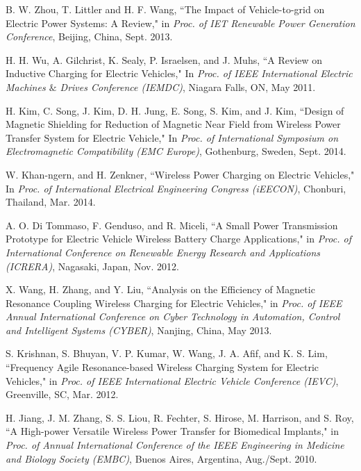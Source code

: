 \documentclass[twocolumn,10pt]{IEEEtran}
\begin{document}
\begin{thebibliography}{99}
B. W. Zhou, T. Littler and H. F. Wang, ``The Impact of Vehicle-to-grid on Electric Power Systems: A Review," in \emph{Proc. of IET Renewable Power Generation Conference}, Beijing, China, Sept. 2013.

 H. H. Wu, A. Gilchrist, K. Sealy, P. Israelsen, and J. Muhs, ``A Review on Inductive Charging for Electric Vehicles,"  In \emph{Proc. of IEEE  International Electric Machines $\&$ Drives Conference (IEMDC)}, Niagara Falls, ON, May 2011.


 H. Kim, C. Song, J. Kim, D. H. Jung, E. Song, S. Kim, and J. Kim, ``Design of Magnetic Shielding for Reduction of Magnetic Near Field from Wireless Power Transfer System for Electric Vehicle," In \emph{Proc. of International Symposium on Electromagnetic Compatibility (EMC Europe)}, Gothenburg, Sweden, Sept. 2014. 
 

 W. Khan-ngern, and H. Zenkner, ``Wireless Power Charging on Electric Vehicles,"  In \emph{Proc. of  International  Electrical Engineering Congress (iEECON)}, Chonburi, Thailand,  Mar. 2014. 
 
  A. O. Di Tommaso, F. Genduso, and R. Miceli, 
``A Small Power Transmission Prototype for Electric Vehicle Wireless Battery Charge Applications," in \emph{Proc. of  International Conference on Renewable Energy Research and Applications (ICRERA)}, Nagasaki, Japan, Nov. 2012.

 X. Wang, H. Zhang, and Y. Liu,
``Analysis on the Efficiency of Magnetic Resonance Coupling Wireless Charging for Electric Vehicles," in \emph{Proc. of  IEEE Annual International Conference on Cyber Technology in Automation, Control and Intelligent Systems (CYBER)}, Nanjing, China, May 2013.
 
  S. Krishnan, S. Bhuyan, V. P. Kumar, W. Wang, J. A. Afif, and K. S. Lim, ``Frequency Agile Resonance-based Wireless Charging System for Electric Vehicles," in \emph{Proc. of IEEE International Electric Vehicle Conference (IEVC)}, Greenville, SC, Mar. 2012.

  H. Jiang, J. M. Zhang, S. S. Liou, R. Fechter, S. Hirose,  M. Harrison, and S. Roy, ``A High-power Versatile Wireless Power Transfer for Biomedical Implants," in \emph{Proc. of Annual International Conference of the IEEE Engineering in Medicine and Biology Society (EMBC)}, Buenos Aires, Argentina, Aug./Sept. 2010. 


\end{thebibliography}
\end{document}
